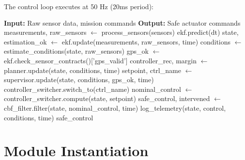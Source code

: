 The control loop executes at 50 Hz (20ms period):

\begin{algorithm}[H]
\caption{Main Control Loop}
\begin{algorithmic}[1]
    \State \textbf{Input:} Raw sensor data, mission commands
    \State \textbf{Output:} Safe actuator commands
        \State {}
        \State measurements, raw\_sensors $\gets$ process\_sensors(sensors)
        \State
        \State {}
        \State ekf.predict(dt)
        \State state, estimation\_ok $\gets$ ekf.update(measurements, raw\_sensors, time)
        \State
        \State {}
        \State conditions $\gets$ estimate\_conditions(state, raw\_sensors)
        \State gps\_ok $\gets$ ekf.check\_sensor\_contracts()['gps\_valid']
        \State
        \State {}
        \State controller\_rec, margin $\gets$ planner.update(state, conditions, time)
        \State
        \State {}
        \State setpoint, ctrl\_name $\gets$ supervisor.update(state, conditions, gps\_ok, time)
        \State
        \State {}
            \State controller\_switcher.switch\_to(ctrl\_name)
        \EndIf
        \State
        \State {}
        \State nominal\_control $\gets$ controller\_switcher.compute(state, setpoint)
        \State
        \State {}
        \State safe\_control, intervened $\gets$ cbf\_filter.filter(state, nominal\_control, time)
        \State
        \State {}
        \State log\_telemetry(state, control, conditions, time)
        \State
        \State \Return safe\_control
    \EndProcedure
\end{algorithmic}
\end{algorithm}

\section{Module Instantiation}


